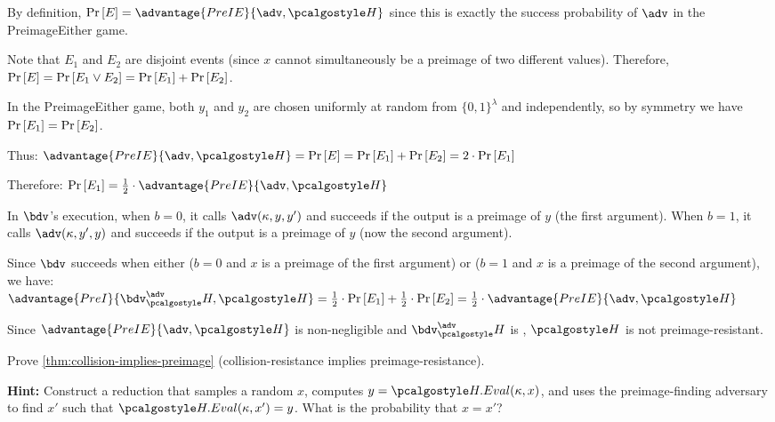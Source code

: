 \begin{mysolution}
  By definition, $\pr{E} = \advantage{PreIE}{\adv, \algo{H}}$ since this is exactly the success probability of $\adv$ in the PreimageEither game.
  
  Note that $E_1$ and $E_2$ are disjoint events (since $x$ cannot simultaneously be a preimage of two different values).
  Therefore, $\Pr\left[ E \right] = \Pr\left[ E_1 \vee E_2 \right] = \Pr\left[ E_1 \right] + \Pr\left[ E_2 \right]$.
  
  In the PreimageEither game, both $y_1$ and $y_2$ are chosen uniformly at random from $\{0,1\}^{\lambda}$ and independently, so by symmetry we have $\Pr\left[ E_1 \right] = \Pr\left[ E_2 \right]$.
  
  Thus: $\advantage{PreIE}{\adv, \algo{H}} = \pr{E} = \pr{E_1} + \pr{E_2} = 2 \cdot \pr{E_1}$
  
  Therefore: $\pr{E_1} = \frac{1}{2} \cdot \advantage{PreIE}{\adv, \algo{H}}$
  
  In $\bdv$'s execution, when $b = 0$, it calls $\adv(\kappa, y, y')$ and succeeds if the output is a preimage of $y$ (the first argument).
  When $b = 1$, it calls $\adv(\kappa, y', y)$ and succeeds if the output is a preimage of $y$ (now the second argument).
  
  Since $\bdv$ succeeds when either ($b = 0$ and $x$ is a preimage of the first argument) or ($b = 1$ and $x$ is a preimage of the second argument), we have:
  $\advantage{PreI}{\bdv^\adv_\algo{H}, \algo{H}} = \frac{1}{2} \cdot \pr{E_1} + \frac{1}{2} \cdot \pr{E_2} = \frac{1}{2} \cdot \advantage{PreIE}{\adv, \algo{H}}$
  
  Since $\advantage{PreIE}{\adv, \algo{H}}$ is non-negligible and $\bdv^\adv_\algo{H}$ is \ppt, $\algo{H}$ is not preimage-resistant.
\end{mysolution}
\fi

\begin{exercise}\label{ex:collision-implies-preimage}
  Prove \autoref{thm:collision-implies-preimage} (collision-resistance implies preimage-resistance).
  
  \textbf{Hint:} Construct a reduction that samples a random $x$, computes $y = \algo{H.Eval}(\kappa, x)$, and uses the preimage-finding adversary to find $x'$ such that $\algo{H.Eval}(\kappa, x') = y$. What is the probability that $x = x'$?
\end{exercise}

